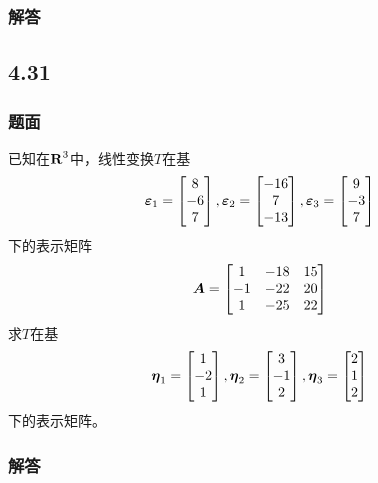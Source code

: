 \documentclass{beamer}
\begin{document}
\begin{frame}
    \frametitle{解答}



\end{frame}

\subsection*{4.31}
\begin{frame}
    \frametitle{题面}

    已知在\(\boldsymbol{\mathrm{R}}^3\)中，线性变换\(T\)在基
    \begin{equation*}
        \boldsymbol{\varepsilon}_1=\begin{bmatrix}8\\-6\\7\end{bmatrix},
        \boldsymbol{\varepsilon}_2=\begin{bmatrix}-16\\7\\-13\end{bmatrix},
        \boldsymbol{\varepsilon}_3=\begin{bmatrix}9\\-3\\7\end{bmatrix}
    \end{equation*}
    下的表示矩阵
    \begin{equation*}
        \boldsymbol{A}=
        \begin{bmatrix}
            1  & -18 & 15 \\
            -1 & -22 & 20 \\
            1  & -25 & 22
        \end{bmatrix}
    \end{equation*}
    求\(T\)在基
    \begin{equation*}
        \boldsymbol{\eta}_1=\begin{bmatrix}1\\-2\\1\end{bmatrix},
        \boldsymbol{\eta}_2=\begin{bmatrix}3\\-1\\2\end{bmatrix},
        \boldsymbol{\eta}_3=\begin{bmatrix}2\\1\\2\end{bmatrix}
    \end{equation*}
    下的表示矩阵。

\end{frame}

\begin{frame}
    \frametitle{解答}



\end{frame}
\end{document}
